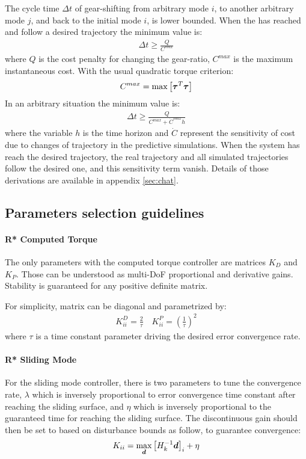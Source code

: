 The cycle time $\Delta t$ of gear-shifting from arbitrary mode $i$, to another arbitrary mode $j$, and back to the initial mode $i$, is lower bounded. When the has reached and follow a desired trajectory the minimum value is:
%
\begin{align}
\Delta t \geq \frac{Q}{C^{max}}
\label{eq:minshifttime}
\end{align}
%
where $Q$ is the cost penalty for changing the gear-ratio, $C^{max}$ is the maximum instantaneous cost. With the usual quadratic torque criterion:
%
\begin{align}
C^{max} = \operatornamewithlimits{max}\left[ \vec{\tau}^T \vec{\tau} \right]
\end{align}
%
In an arbitrary situation the minimum value is:
%
\begin{align}
\Delta t \geq \frac{ Q }{ C^{max} + \dot{C}^{max} h }
\end{align}
%
where the variable $h$ is the time horizon and $\dot{C}$ represent the sensitivity of cost due to changes of trajectory in the predictive simulations. When the system has reach the desired trajectory, the real trajectory and all simulated trajectories follow the desired one, and this sensitivity term vanish. Details of those derivations are available in appendix \ref{sec:chat}.


\subsection{Parameters selection guidelines}

\paragraph{R* Computed Torque} The only parameters with the computed torque controller are matrices $K_D$ and $K_P$. Those can be understood as multi-DoF proportional and derivative gains. Stability is guaranteed for any positive definite matrix.

For simplicity, matrix can be diagonal and parametrized by:
%
\begin{align}
K^D_{ii} = \frac{2}{\tau} \quad   K^P_{ii} = \left(\frac{1}{\tau}\right)^2
\label{eq:ctctau}
\end{align}
%
where $\tau$ is a time constant parameter driving the desired error convergence rate.

\paragraph{R* Sliding Mode} For the sliding mode controller, there is two parameters to tune the convergence rate, $\lambda$ which is inversely proportional to error convergence time constant after reaching the sliding surface, and $\eta$ which is inversely proportional to the guaranteed time for reaching the sliding surface. The discontinuous gain should then be set to based on disturbance bounds as follow, to guarantee convergence:
%
\begin{align}
K_{ii} = \operatornamewithlimits{max}\limits_{\vec{d}} \left[ H_k^{-1} \vec{d} \right]_i + \eta
\end{align}
%

